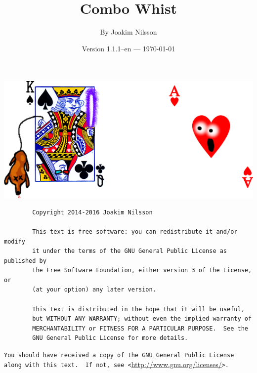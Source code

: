 \documentclass[a4paper]{article}
\title{Combo Whist}
\author{By Joakim Nilsson}
\date{Version 1.1.1--en --- \today}
\begin{document}
	\maketitle

	\vfill

	\begin{center}
		\includegraphics[width = \textwidth]{logo.png}
	\end{center}

	\vfill

	\begin{verbatim}
		Copyright 2014-2016 Joakim Nilsson

		This text is free software: you can redistribute it and/or modify
		it under the terms of the GNU General Public License as published by
		the Free Software Foundation, either version 3 of the License, or
		(at your option) any later version.

		This text is distributed in the hope that it will be useful,
		but WITHOUT ANY WARRANTY; without even the implied warranty of
		MERCHANTABILITY or FITNESS FOR A PARTICULAR PURPOSE.  See the
		GNU General Public License for more details.
	\end{verbatim}
	\verb|You should have received a copy of the GNU General Public License|\\
	\verb|along with this text.  If not, see <|\url{http://www.gnu.org/licenses/}\verb|>.|

	\thispagestyle{empty}
	\pagebreak

	\setcounter{tocdepth}{3}
	\tableofcontents
	\listoftables
	\thispagestyle{empty}
	\pagebreak
\end{document}
